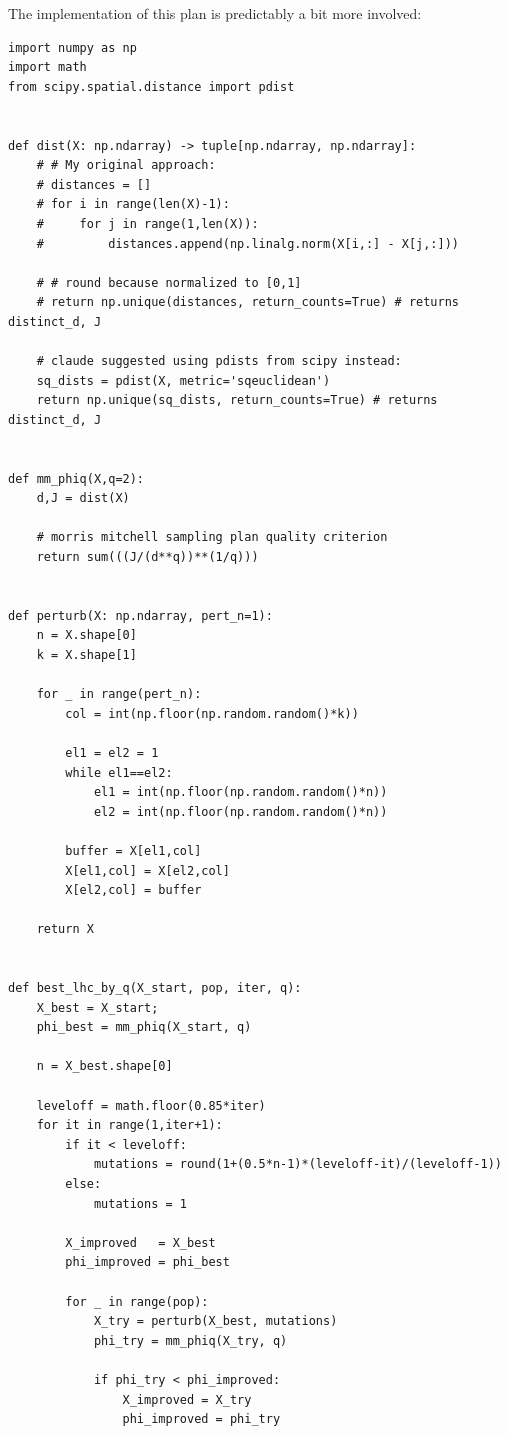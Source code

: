\documentclass[11pt]{article}
\theoremstyle{definition}
\begin{document}
The implementation of this plan is predictably a bit more involved:
\begin{lstlisting}
import numpy as np
import math
from scipy.spatial.distance import pdist


def dist(X: np.ndarray) -> tuple[np.ndarray, np.ndarray]:
    # # My original approach:
    # distances = []
    # for i in range(len(X)-1):
    #     for j in range(1,len(X)):
    #         distances.append(np.linalg.norm(X[i,:] - X[j,:]))
    
    # # round because normalized to [0,1]
    # return np.unique(distances, return_counts=True) # returns distinct_d, J

    # claude suggested using pdists from scipy instead:
    sq_dists = pdist(X, metric='sqeuclidean')
    return np.unique(sq_dists, return_counts=True) # returns distinct_d, J


def mm_phiq(X,q=2):
    d,J = dist(X)

    # morris mitchell sampling plan quality criterion
    return sum(((J/(d**q))**(1/q)))


def perturb(X: np.ndarray, pert_n=1):
    n = X.shape[0]
    k = X.shape[1]

    for _ in range(pert_n):
        col = int(np.floor(np.random.random()*k))
        
        el1 = el2 = 1
        while el1==el2:
            el1 = int(np.floor(np.random.random()*n))
            el2 = int(np.floor(np.random.random()*n))

        buffer = X[el1,col]
        X[el1,col] = X[el2,col]
        X[el2,col] = buffer

    return X


def best_lhc_by_q(X_start, pop, iter, q):
    X_best = X_start; 
    phi_best = mm_phiq(X_start, q)

    n = X_best.shape[0]

    leveloff = math.floor(0.85*iter)
    for it in range(1,iter+1):
        if it < leveloff:
            mutations = round(1+(0.5*n-1)*(leveloff-it)/(leveloff-1))
        else:
            mutations = 1
    
        X_improved   = X_best
        phi_improved = phi_best
        
        for _ in range(pop):
            X_try = perturb(X_best, mutations)
            phi_try = mm_phiq(X_try, q)
            
            if phi_try < phi_improved:
                X_improved = X_try
                phi_improved = phi_try
        

\end{lstlisting}
\end{document}
